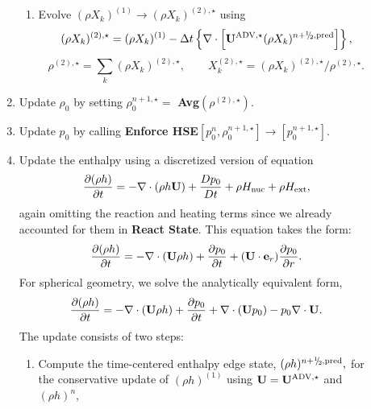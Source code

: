 \documentclass{aastex62}
\newcommand{\sfrac}[2]{\mathchoice
  {\kern0em\raise.5ex\hbox{\the\scriptfont0 #1}\kern-.15em/
   \kern-.15em\lower.25ex\hbox{\the\scriptfont0 #2}}
  {\kern0em\raise.5ex\hbox{\the\scriptfont0 #1}\kern-.15em/
   \kern-.15em\lower.25ex\hbox{\the\scriptfont0 #2}}
  {\kern0em\raise.5ex\hbox{\the\scriptscriptfont0 #1}\kern-.2em/
   \kern-.15em\lower.25ex\hbox{\the\scriptscriptfont0 #2}}
  {#1\!/#2}}
\newcommand{\myhalf}{\sfrac{1}{2}}
\newcommand{\eb}{{\bf{e}}}
\newcommand{\Ub}{{\bf{U}}}
\newcommand{\dt}{\Delta t}
\newcommand{\Hext}{H_{\rm ext}}
\newcommand{\Hnuc}{H_{\rm nuc}}
\newcommand{\pred}{{\rm pred}}
\newcommand{\nph}{{n+\myhalf}}
\newcommand{\uadvone}{\Ub^{\mathrm{ADV},\star}}
\begin{document}
\begin{description}
\begin{enumerate}
\begin{enumerate}
\item Evolve $(\rho X_k)^{(1)} \rightarrow (\rho X_k)^{(2),\star}$ using
\begin{equation}
(\rho X_k)^{(2),\star} = (\rho X_k)^{(1)}
  - \dt \left\{ \nabla \cdot \left[ \uadvone (\rho X_k)^{\nph,\pred} \right] \right\},
\end{equation}
\begin{equation}
\rho^{(2),\star} = \sum_k (\rho X_k)^{(2),\star},
\qquad
X_k^{(2),\star} = (\rho X_k)^{(2),\star} / \rho^{(2),\star}.
\end{equation}

\end{enumerate}

\item Update $\rho_0$ by setting $\rho_0^{n+1,\star} =$ {\bf Avg}$(\rho^{(2),\star})$.

\item Update $p_0$ by calling
{\bf Enforce HSE}$[p_0^n,\rho_0^{n+1,\star}] \rightarrow [p_0^{n+1,\star}]$.

\item Update the enthalpy using a discretized version of equation
%
\begin{equation}
\frac{\partial(\rho h)}{\partial t} = -\nabla\cdot(\rho h\Ub) + \frac{Dp_0}{Dt} + \rho\Hnuc + \rho\Hext,
\end{equation}
%
again omitting the reaction and heating terms
since we already accounted for
them in {\bf React State}.  This equation takes the form:
\begin{equation}
\frac{\partial (\rho h)}{\partial t}  = - \nabla \cdot (\Ub \rho h) + \frac{\partial p_0}{\partial t} + (\Ub \cdot \eb_r) \frac{\partial p_0}{\partial r}.
\end{equation}
For spherical geometry, we solve the
analytically equivalent form,
\begin{equation}
\frac{\partial (\rho h)}{\partial t}  = - \nabla \cdot (\Ub \rho h) + \frac{\partial p_0}{\partial t} + \nabla \cdot (\Ub p_0) - p_0 \nabla \cdot \Ub.
\end{equation}
The update consists of two steps:

\begin{enumerate}
\renewcommand{\labelenumii}{{\bf \roman{enumii}}.}

\item Compute the time-centered enthalpy edge state, $(\rho h)^{\nph,\pred},$
  for the conservative update of $(\rho h)^{(1)}$
  using $\Ub = \uadvone$ and $(\rho h)^n$,


\end{enumerate}
\end{enumerate}
\end{description}
\end{document}
